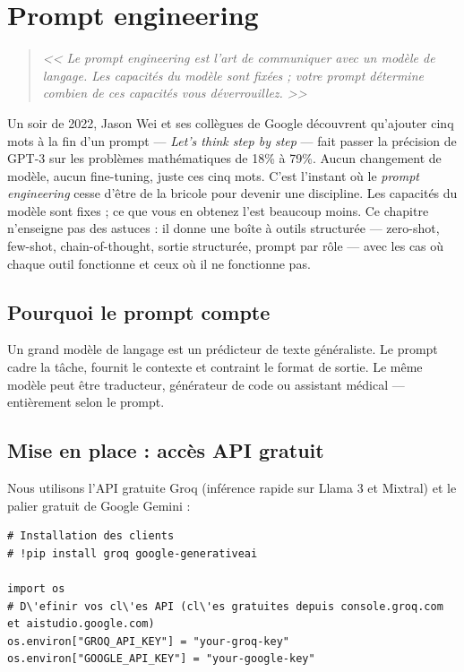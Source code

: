 \chapter{Prompt engineering}
\label{ch:prompt-engineering}

\begin{quote}
\emph{<< Le prompt engineering est l'art de communiquer avec un mod\`ele de langage. Les capacit\'es du mod\`ele sont fix\'ees ; votre prompt d\'etermine combien de ces capacit\'es vous d\'everrouillez. >>}
\end{quote}

Un soir de 2022, Jason Wei et ses collègues de Google découvrent qu'ajouter cinq mots à la fin d'un prompt --- \emph{Let's think step by step} --- fait passer la précision de GPT-3 sur les problèmes mathématiques de 18\% à 79\%. Aucun changement de modèle, aucun fine-tuning, juste ces cinq mots. C'est l'instant où le \emph{prompt engineering} cesse d'être de la bricole pour devenir une discipline. Les capacités du modèle sont fixes ; ce que vous en obtenez l'est beaucoup moins. Ce chapitre n'enseigne pas des astuces : il donne une boîte à outils structurée --- zero-shot, few-shot, chain-of-thought, sortie structurée, prompt par rôle --- avec les cas où chaque outil fonctionne et ceux où il ne fonctionne pas.
\section{Pourquoi le prompt compte}

Un grand mod\`ele de langage est un pr\'edicteur de texte g\'en\'eraliste. Le prompt cadre la t\^ache, fournit le contexte et contraint le format de sortie. Le m\^eme mod\`ele peut \^etre traducteur, g\'en\'erateur de code ou assistant m\'edical --- enti\`erement selon le prompt.

\section{Mise en place : acc\`es API gratuit}

Nous utilisons l'API gratuite Groq (inf\'erence rapide sur Llama 3 et Mixtral) et le palier gratuit de Google Gemini :

\begin{verbatim}
# Installation des clients
# !pip install groq google-generativeai

import os
# D\'efinir vos cl\'es API (cl\'es gratuites depuis console.groq.com et aistudio.google.com)
os.environ["GROQ_API_KEY"] = "your-groq-key"
os.environ["GOOGLE_API_KEY"] = "your-google-key"
\end{verbatim}

